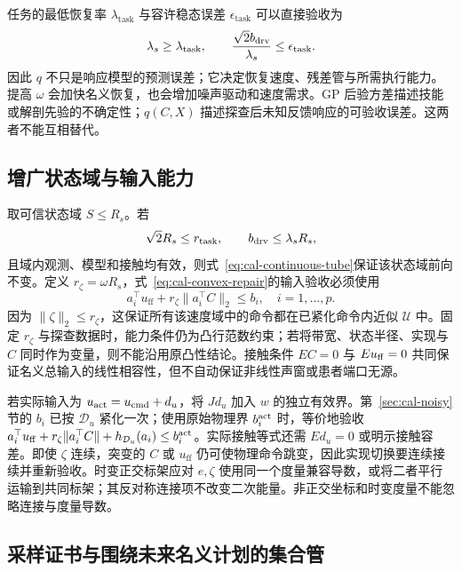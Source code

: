 \documentclass[11pt,a4paper]{article}
\numberwithin{equation}{section}
\theoremstyle{definition}
\begin{document}
任务的最低恢复率 $\lambda_{\mathrm{task}}$ 与容许稳态误差 $\epsilon_{\mathrm{task}}$ 可以直接验收为
\begin{equation}
 \lambda_s\ge\lambda_{\mathrm{task}},\qquad
 \frac{\sqrt2b_{\rm drv}}{\lambda_s}\le\epsilon_{\mathrm{task}}.
 \label{eq:cal-task-rate}
\end{equation}
因此 $q$ 不只是响应模型的预测误差；它决定恢复速度、残差管与所需执行能力。提高 $\omega$ 会加快名义恢复，也会增加噪声驱动和速度需求。GP 后验方差描述技能或解剖先验的不确定性；$q(C,X)$ 描述探查后未知反馈响应的可验收误差。这两者不能互相替代。

\subsection{增广状态域与输入能力}

取可信状态域 $S\le R_s$。若
\begin{equation}
 \sqrt2R_s\le r_{\mathrm{task}},\qquad
 b_{\rm drv}\le\lambda_sR_s,
 \label{eq:cal-servo-invariant}
\end{equation}
且域内观测、模型和接触均有效，则式~\eqref{eq:cal-continuous-tube}保证该状态域前向不变。定义 $r_\zeta=\omega R_s$，式~\eqref{eq:cal-convex-repair}的输入验收必须使用
\begin{equation}
 \boxed{a_i^\top u_{\mathrm{ff}}
       +r_\zeta\|a_i^\top C\|_2\le b_i,
       \quad i=1,\ldots,p.}
 \label{eq:cal-servo-capability}
\end{equation}
因为 $\|\zeta\|_2\le r_\zeta$，这保证所有该速度域中的命令都在已紧化命令内近似 $\mathcal U$ 中。固定 $r_\zeta$ 与探查数据时，能力条件仍为凸行范数约束；若将带宽、状态半径、实现与 $C$ 同时作为变量，则不能沿用原凸性结论。接触条件 $EC=0$ 与 $Eu_{\rm ff}=0$ 共同保证名义总输入的线性相容性，但不自动保证非线性声窗或患者端口无源。

若实际输入为 $u_{\rm act}=u_{\rm cmd}+d_u$，将 $Jd_u$ 加入 $w$ 的独立有效界。第~\ref{sec:cal-noisy}节的 $b_i$ 已按 $\mathcal D_u$ 紧化一次；使用原始物理界 $b_i^{\rm act}$ 时，等价地验收 $a_i^\top u_{\rm ff}+r_\zeta\|a_i^\top C\|+h_{\mathcal D_u}(a_i)\le b_i^{\rm act}$。实际接触等式还需 $Ed_u=0$ 或明示接触容差。即使 $\zeta$ 连续，突变的 $C$ 或 $u_{\mathrm{ff}}$ 仍可使物理命令跳变，因此实现切换要连续接续并重新验收。时变正交标架应对 $e,\zeta$ 使用同一个度量兼容导数，或将二者平行运输到共同标架；其反对称连接项不改变二次能量。非正交坐标和时变度量不能忽略连接与度量导数。

\subsection{采样证书与围绕未来名义计划的集合管}
\end{document}
